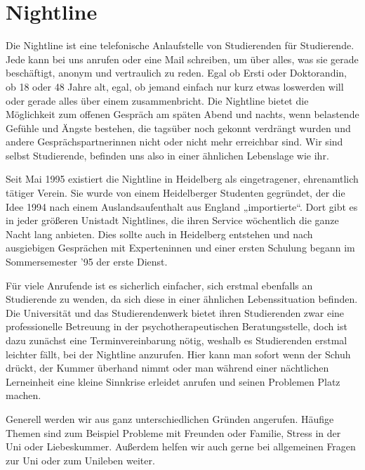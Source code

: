 \section{Nightline}%
Die Nightline ist eine telefonische Anlaufstelle von Studierenden für Studierende. Jede kann bei uns anrufen oder eine Mail schreiben, um über alles, was sie gerade beschäftigt, anonym und vertraulich zu reden. Egal ob Ersti oder Doktorandin, ob 18 oder 48 Jahre alt, egal, ob jemand einfach nur kurz etwas loswerden will oder gerade alles über einem zusammenbricht. Die Nightline bietet die Möglichkeit zum offenen Gespräch am späten Abend und nachts, wenn belastende Gefühle und Ängste bestehen, die tagsüber noch gekonnt verdrängt wurden und andere Gesprächspartnerinnen nicht oder nicht mehr erreichbar sind. Wir sind selbst Studierende, befinden uns also in einer ähnlichen Lebenslage wie ihr.


Seit Mai 1995 existiert die Nightline in Heidelberg als eingetragener, ehrenamtlich tätiger Verein. Sie wurde von einem Heidelberger Studenten gegründet, der die Idee 1994 nach einem Auslandsaufenthalt aus England „importierte“. Dort gibt es in jeder größeren Unistadt Nightlines, die ihren Service wöchentlich die ganze Nacht lang anbieten. Dies sollte auch in Heidelberg entstehen und nach ausgiebigen Gesprächen mit Experteninnen und einer ersten Schulung begann im Sommersemester '95 der erste Dienst.

Für viele Anrufende ist es sicherlich einfacher, sich erstmal ebenfalls an Studierende zu wenden, da sich diese in einer ähnlichen Lebenssituation befinden. Die Universität und das Studierendenwerk bietet ihren Studierenden zwar eine professionelle Betreuung in der psychotherapeutischen Beratungsstelle, doch ist dazu zunächst eine Terminvereinbarung nötig, weshalb es Studierenden erstmal leichter fällt, bei der Nightline anzurufen. Hier kann man sofort wenn der Schuh drückt, der Kummer überhand nimmt oder man während einer nächtlichen Lerneinheit eine kleine Sinnkrise erleidet anrufen und seinen Problemen Platz machen.

Generell werden wir aus ganz unterschiedlichen Gründen angerufen. Häufige Themen sind zum Beispiel Probleme mit Freunden oder Familie, Stress in der Uni oder Liebeskummer. Außerdem helfen wir auch gerne bei allgemeinen Fragen zur Uni oder zum Unileben weiter.

